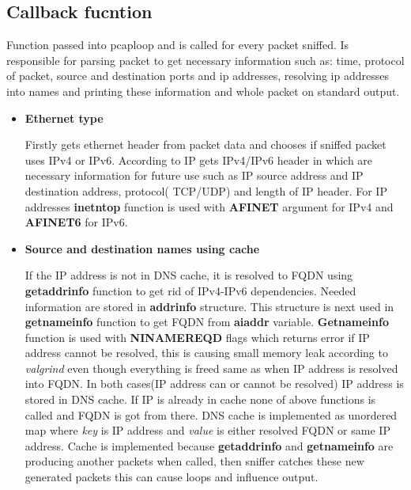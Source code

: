 \documentclass{article}
\begin{document}
\subsection{Callback fucntion}
Function passed into pcap\textunderscore loop and is called for every packet sniffed. Is responsible for parsing packet to get necessary information such as: time, protocol of packet, source and destination ports and ip addresses, resolving ip addresses into names and printing these information and whole packet on standard output.
\begin{itemize}
 	\item \textbf{Ethernet type} \newline
 	
 	Firstly gets ethernet header from packet data and chooses if sniffed packet uses IPv4 or IPv6. According to IP gets IPv4/IPv6 header in which are necessary information for future use such as IP source address and IP destination address, protocol( TCP/UDP) and length of IP header. For IP addresses \textbf{inet\textunderscore ntop} function is used with \textbf{AF\textunderscore INET} argument for IPv4 and \textbf{AF\textunderscore INET6} for IPv6.
 	
	\item \textbf{Source and destination names using cache} \newline
	
	If the IP address is not in DNS cache, it is resolved to FQDN using \textbf{getaddrinfo} function to get rid of IPv4-IPv6 dependencies. Needed information are stored in \textbf{addrinfo} structure. This structure is next used in \textbf{getnameinfo} function to get FQDN from \textbf{ai\textunderscore addr} variable. \textbf{Getnameinfo} function is used with \textbf{NI\textunderscore NAMEREQD} flags which returns error if IP address cannot be resolved, this is causing small memory leak according to \textit{valgrind} even though everything is freed same as when IP address is resolved into FQDN. In both cases(IP address can or cannot be resolved) IP address is stored in DNS cache. If IP is already in cache none of above functions is called and FQDN is got from there.
	DNS cache is implemented as unordered map where \textit{key} is IP address and \textit{value} is either resolved FQDN or same IP address. Cache is implemented because \textbf{getaddrinfo} and \textbf{getnameinfo} are producing another packets when called, then sniffer catches these new generated packets this can cause loops and influence output. 
	\newpage
	

\end{itemize}
\end{document}
